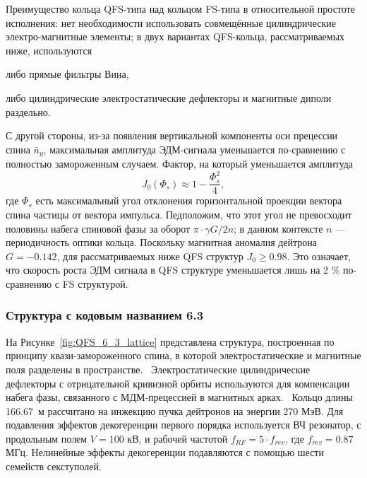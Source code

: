 Преимущество кольца QFS-типа над кольцом FS-типа в относительной простоте исполнения: нет необходимости использовать совмещённые цилиндрические электро-магнитные элементы; в двух вариантах QFS-кольца, рассматриваемых ниже, используются 
\begin{enumerate*}
\item либо прямые фильтры Вина, 
\item либо цилиндрические электростатические дефлекторы и магнитные диполи раздельно.
\end{enumerate*}
С другой стороны, из-за появления вертикальной компоненты оси прецессии спина $\bar n_y$, максимальная амплитуда ЭДМ-сигнала уменьшается по-сравнению с полностью замороженным случаем. Фактор, на который уменьшается амплитуда~\cite{Senichev:QFS_IPAC15}
\[
J_0(\Phi_s) \approx 1 - \frac{\Phi_s^2}{4},
\]
где $\Phi_s$ есть максимальный угол отклонения горизонтальной проекции вектора спина частицы от вектора импульса. Педположим, что этот угол не превосходит половины набега спиновой фазы за оборот $\pi\cdot \gamma G/2n$; в данном контексте $n$ --- периодичность оптики кольца. Поскольку магнитная аномалия дейтрона $G = -0.142$, для рассматриваемых ниже QFS структур $J_0\ge 0.98$.
Это означает, что скорость роста ЭДМ сигнала в QFS структуре уменьшается лишь на 2 \% по-сравнению с  FS структурой. 

\subsubsection{Структура с кодовым названием 6.3}\label{chpt2:lattice:QFS:6_3}

На Рисунке~\ref{fig:QFS_6_3_lattice} представлена структура, построенная по принципу квази-замороженного спина, в которой электростатические и магнитные поля разделены в пространстве.~\cite{Senichev:Lattices} Электростатические цилиндрические дефлекторы с отрицательной кривизной орбиты используются для компенсации набега фазы, связанного с МДМ-прецессией в магнитных арках.~\cite{Senichev:QFS_IPAC15} Кольцо длины 166.67~м рассчитано на инжекцию пучка дейтронов на энергии 270 МэВ. Для подавления эффектов декогеренции первого порядка используется ВЧ резонатор, с продольным полем $V = 100$ кВ, и рабочей частотой $f_{RF} = 5\cdot f_{rev}$, где $f_{rev} = 0.87$ МГц. Нелинейные эффекты декогеренции подавляются с помощью шести семейств секступолей.

